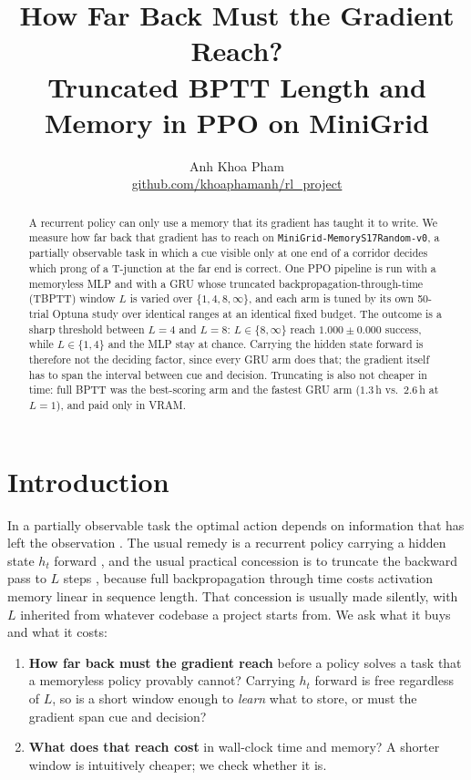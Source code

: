 \documentclass{article}
\title{How Far Back Must the Gradient Reach?\\
Truncated BPTT Length and Memory in PPO on MiniGrid}
\author{Anh Khoa Pham \\ \url{github.com/khoaphamanh/rl_project}}
\begin{document}
\maketitle
\begin{abstract}
    A recurrent policy can only use a memory that its gradient has taught it to
    write. We measure how far back that gradient has to reach on
    \texttt{MiniGrid-MemoryS17Random-v0}, a partially observable task in which a
    cue visible only at one end of a corridor decides which prong of a
    T-junction at the far end is correct. One PPO pipeline is run with a
    memoryless MLP and with a GRU whose truncated backpropagation-through-time
    (TBPTT) window $L$ is varied over $\{1, 4, 8, \infty\}$, and each arm is
    tuned by its own 50-trial Optuna study over identical ranges at an identical
    fixed budget. The outcome is a sharp threshold between $L=4$ and $L=8$:
    $L \in \{8, \infty\}$ reach $1.000 \pm 0.000$ success, while $L \in \{1,4\}$
    and the MLP stay at chance. Carrying the hidden state forward is therefore
    not the deciding factor, since every GRU arm does that; the gradient itself
    has to span the interval between cue and decision. Truncating is also not
    cheaper in time: full BPTT was the best-scoring arm and the fastest GRU arm
    ($1.3$\,h vs.\ $2.6$\,h at $L=1$), and paid only in VRAM.
\end{abstract}

\section{Introduction}

In a partially observable task the optimal action depends on information that
has left the observation \citep{pomdp}. The usual remedy is a recurrent policy
carrying a hidden state $h_t$ forward \citep{drqn, recurrentbaseline}, and the
usual practical concession is to truncate the backward pass to $L$ steps
\citep{tbptt, r2d2}, because full backpropagation through time \citep{bptt}
costs activation memory linear in sequence length. That concession is usually
made silently, with $L$ inherited from whatever codebase a project starts from.
We ask what it buys and what it costs:

\begin{enumerate}
    \item \textbf{How far back must the gradient reach} before a policy solves a
    task that a memoryless policy provably cannot? Carrying $h_t$ forward is free
    regardless of $L$, so is a short window enough to \emph{learn} what to store,
    or must the gradient span cue and decision?
    \item \textbf{What does that reach cost} in wall-clock time and memory? A
    shorter window is intuitively cheaper; we check whether it is.
\end{enumerate}
\end{document}
